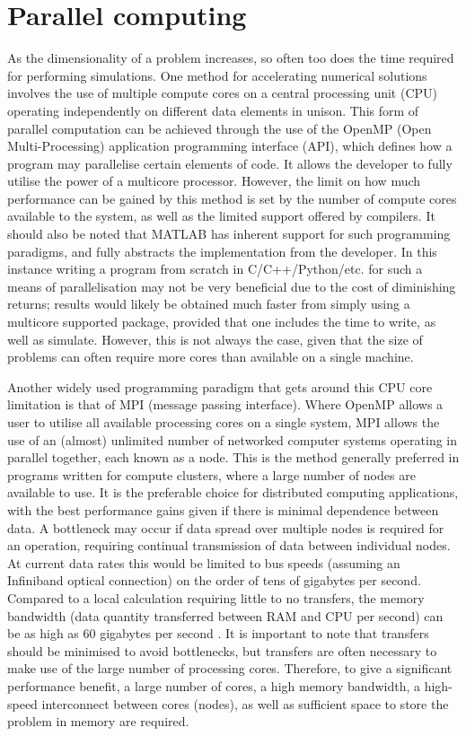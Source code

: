 \section{Parallel computing}

As the dimensionality of a problem increases, so often too does the time required for performing simulations. One method for accelerating numerical solutions involves the use of multiple compute cores on a central processing unit (CPU) operating independently on different data elements in unison. This form of parallel computation can be achieved through the use of the OpenMP (Open Multi-Processing) application programming interface (API), which defines how a program may parallelise certain elements of code. It allows the developer to fully utilise the power of a multicore processor. However, the limit on how much performance can be gained by this method is set by the number of compute cores available to the system, as well as the limited support offered by compilers. It should also be noted that \textsc{MATLAB} has inherent support for such programming paradigms, and fully abstracts the implementation from the developer. In this instance writing a program from scratch in C/C++/Python/etc. for such a means of parallelisation may not be very beneficial due to the cost of diminishing returns; results would likely be obtained much faster from simply using a multicore supported package, provided that one includes the time to write, as well as simulate. However, this is not always the case, given that the size of problems can often require more cores than available on a single machine.

Another widely used programming paradigm that gets around this CPU core limitation is that of MPI (message passing interface). Where OpenMP allows a user to utilise all available processing cores on a single system, MPI allows the use of an (almost) unlimited number of networked computer systems operating in parallel together, each known as a node. This is the method generally preferred in programs written for compute clusters, where a large number of nodes are available to use. It is the preferable choice for distributed computing applications, with the best performance gains given if there is minimal dependence between data. A bottleneck may occur if data spread over multiple nodes is required for an operation, requiring continual transmission of data between individual nodes. At current data rates this would be limited to bus speeds (assuming an Infiniband optical connection) on the order of tens of gigabytes per second. Compared to a local calculation requiring little to no transfers, the memory bandwidth (data quantity transferred between RAM and CPU per second) can be as high as 60 gigabytes per second \cite{DAT:Intel_xeon}. It is important to note that transfers should be minimised to avoid bottlenecks, but transfers are often necessary to make use of the large number of processing cores. Therefore, to give a significant performance benefit, a large number of cores, a high memory bandwidth, a high-speed interconnect between cores (nodes), as well as sufficient space to store the problem in memory are required.

